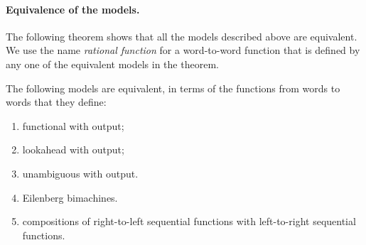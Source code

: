 \paragraph*{Equivalence of the models.} The following theorem shows that all  the models described above are equivalent. We use the name \emph{rational function} for a word-to-word function that is defined by any one of the  equivalent models in the theorem. 
  \begin{theorem}\label{thm:rational-functions}
The following models are equivalent, in terms of the functions from words to words that they define:
\begin{enumerate}
	\item functional \nfa with output;
\item  lookahead \dfa with output;
 \item  unambiguous \nfa with output.
 \item  Eilenberg bimachines.
 \item compositions of right-to-left sequential functions with  left-to-right sequential functions.
\end{enumerate}	
\end{theorem}

